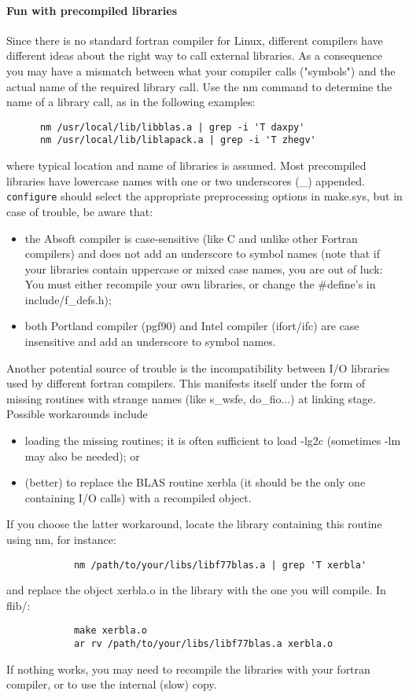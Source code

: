 \documentclass[12pt,a4paper]{article}
\begin{document}
\paragraph{Fun with precompiled libraries}
Since there is no standard fortran compiler for Linux, different
compilers have different ideas about the right way to call external
libraries. As a consequence you may have a mismatch between what your
compiler calls ("symbols") and the actual name of the required 
library call. Use the nm command to determine the name of a library
call, as in the following examples:
\begin{verbatim}
      nm /usr/local/lib/libblas.a | grep -i 'T daxpy'
      nm /usr/local/lib/liblapack.a | grep -i 'T zhegv'
\end{verbatim}
where typical location and name of libraries is assumed. Most precompiled
libraries have lowercase names with one or two underscores (\_) appended.
\texttt{configure} should select the appropriate preprocessing options in make.sys,
but in case of trouble, be aware that:
\begin{itemize}
\item
the Absoft compiler is case-sensitive (like C and unlike other Fortran
compilers) and does not add an underscore to symbol names (note that
if your libraries contain uppercase or mixed case names, you are out
of luck: You must either recompile your own libraries, or change the
\#define's in include/f\_defs.h); 
\item 
both Portland compiler (pgf90) and Intel compiler (ifort/ifc)
are case insensitive and add an underscore to symbol names. 
\end{itemize}
Another potential source of trouble is the incompatibility between I/O
libraries used by different fortran compilers. This manifests itself
under the form of missing routines with strange names (like s\_wsfe, 
do\_fio...) at linking stage. Possible workarounds include
\begin{itemize}
\item
loading the missing routines; it is often sufficient to load -lg2c
(sometimes -lm may also be needed); or 
\item
 (better) to replace the BLAS routine xerbla (it should be the only
  one containing I/O calls) with a recompiled object.  
\end{itemize}
If you choose the latter workaround, locate the library containing
this routine using nm, for instance: 
\begin{verbatim}
            nm /path/to/your/libs/libf77blas.a | grep 'T xerbla'
\end{verbatim}
and replace the object xerbla.o in the library with the one you will
compile. In flib/: 
\begin{verbatim}
            make xerbla.o
            ar rv /path/to/your/libs/libf77blas.a xerbla.o
\end{verbatim}
If nothing works, you may need to recompile the libraries with your fortran
compiler, or to use the internal (slow) copy.
\end{document}

